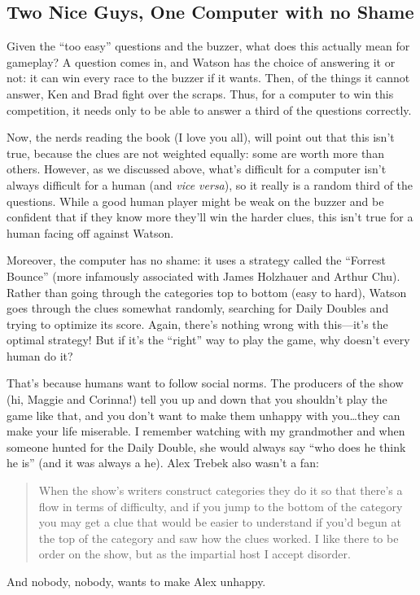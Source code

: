 \subsection{Two Nice Guys, One Computer with no Shame}

Given the ``too easy'' questions and the buzzer, what does this
actually mean for gameplay?
%
A question comes in, and Watson has the choice of answering it or not:
it can win every race to the buzzer if it wants.
%
Then, of the things it cannot answer, Ken and Brad fight over the
scraps.
%
Thus, for a computer to win this competition, it needs only to be able
to answer a third of the questions correctly.

Now, the \jeopardy{} nerds reading the book (I love you all), will
point out that this isn't true, because the clues are not weighted
equally: some are worth more than others.
%
However, as we discussed above, what's difficult for a computer isn't
always difficult for a human (and \textit{vice versa}), so it really
is a random third of the questions.
%
While a good human player might be weak on the buzzer and be confident
that if they know more they'll win the harder clues, this isn't true
for a human facing off against Watson.

Moreover, the computer has no shame: it uses a strategy called the
``Forrest Bounce'' (more infamously associated with James Holzhauer
and Arthur Chu).
%
Rather than going through the categories top to bottom (easy to hard),
Watson goes through the clues somewhat randomly, searching for Daily
Doubles and trying to optimize its score.
%
Again, there's nothing wrong with this---it's the optimal strategy!
%
But if it's the ``right'' way to play the game, why doesn't every
human do it?

That's because humans want to follow social norms.
%
The producers of the show (hi, Maggie and Corinna!) tell you up and
down that you shouldn't play the game like that, and you don't want to
make them unhappy with you\dots they can make your life miserable.
%
I remember watching \jeopardy{} with my grandmother and when someone
hunted for the Daily Double, she would always say ``who does he think
he is'' (and it was always a he).
%
Alex Trebek also wasn't a fan:
%
\begin{quote}
  When the show's writers construct categories they do it so that
  there's a flow in terms of difficulty, and if you jump to the bottom
  of the category you may get a clue that would be easier to
  understand if you'd begun at the top of the category and saw how the
  clues worked. I like there to be order on the show, but as the
  impartial host I accept disorder.
\end{quote}
%
And nobody, nobody, wants to make Alex unhappy.

